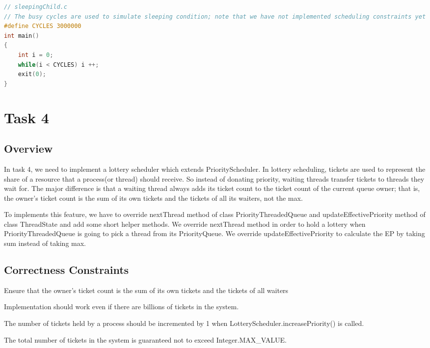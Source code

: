 \documentclass{article}
\begin{document}
\begin{spacing}{1.1}
\begin{lstlisting}[language=C]
// sleepingChild.c
// The busy cycles are used to simulate sleeping condition; note that we have not implemented scheduling constraints yet
#define CYCLES 3000000
int main()
{
    int i = 0;
    while(i < CYCLES) i ++;
    exit(0);
}
\end{lstlisting}

\section{Task 4}

\subsection{Overview}
In task 4, we need to implement a lottery scheduler which extends \textsf{PriorityScheduler}. In lottery scheduling, tickets are used to represent the share of a resource that a process(or thread) should receive. So instead of donating priority, waiting threads transfer tickets to threads they wait for. The major difference is that a waiting thread always adds its ticket count to the ticket count of the current queue owner; that is, the owner's ticket count is the sum of its own tickets and the tickets of all its waiters, not the max.

To implements this feature, we have to override \textsf{nextThread} method of class \textsf{PriorityThreadedQueue} and \textsf{updateEffectivePriority} method of class \textsf{ThreadState} and add some short helper methods. We override \textsf{nextThread} method in order to hold a lottery when \textsf{PriorityThreadedQueue} is going to pick a thread from its \textsf{PriorityQueue}. We override \textsf{updateEffectivePriority} to calculate the EP by taking sum instead of taking max.

\subsection{Correctness Constraints}

\begin{asparaitem}
\item Ensure that the owner's ticket count is the sum of its own tickets and the tickets of all waiters
\item Implementation should work even if there are billions of tickets in the system.
\item The number of tickets held by a process should be incremented by 1 when \textsf{LotteryScheduler.increasePriority()} is called.
\item The total number of tickets in the system is guaranteed not to exceed \textsf{Integer.MAX}\_\textsf{VALUE}.
\end{asparaitem}


\end{spacing}
\end{document}
